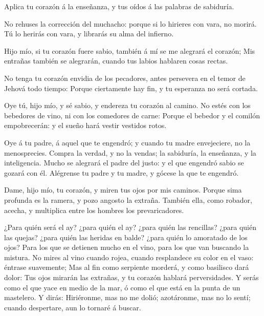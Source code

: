  Aplica tu corazón á la enseñanza, y tus oídos á las
palabras de sabiduría.

 No rehuses la corrección del muchacho: porque si lo
hirieres con vara, no morirá.  Tú lo herirás con vara, y
librarás su alma del infierno.

 Hijo mío, si tu corazón fuere sabio, también á mí se me
alegrará el corazón;  Mis entrañas también se alegrarán,
cuando tus labios hablaren cosas rectas.

 No tenga tu corazón envidia de los pecadores, antes
persevera en el temor de Jehová todo tiempo:  Porque
ciertamente hay fin, y tu esperanza no será cortada.

 Oye tú, hijo mío, y sé sabio, y endereza tu corazón al
camino.  No estés con los bebedores de vino, ni con los
comedores de carne:  Porque el bebedor y el comilón
empobrecerán: y el sueño hará vestir vestidos rotos.

 Oye á tu padre, á aquel que te engendró; y cuando tu
madre envejeciere, no la menosprecies.  Compra la verdad,
y no la vendas; la sabiduría, la enseñanza, y la inteligencia.
 Mucho se alegrará el padre del justo: y el que engendró
sabio se gozará con él.  Alégrense tu padre y tu madre, y
gócese la que te engendró.

 Dame, hijo mío, tu corazón, y miren tus ojos por mis
caminos.  Porque sima profunda es la ramera, y pozo
angosto la extraña.  También ella, como robador, acecha,
y multiplica entre los hombres los prevaricadores.

 ¿Para quién será el ay? ¿para quién el ay? ¿para quién
las rencillas? ¿para quién las quejas? ¿para quién las heridas en balde?
¿para quién lo amoratado de los ojos?  Para los que se
detienen mucho en el vino, para los que van buscando la mistura.
 No mires al vino cuando rojea, cuando resplandece su
color en el vaso: éntrase suavemente;  Mas al fin como
serpiente morderá, y como basilisco dará dolor:  Tus ojos
mirarán las extrañas, y tu corazón hablará perversidades.
 Y serás como el que yace en medio de la mar, ó como el
que está en la punta de un mastelero.  Y dirás:
Hiriéronme, mas no me dolió; azotáronme, mas no lo sentí; cuando
despertare, aun lo tornaré á buscar.

